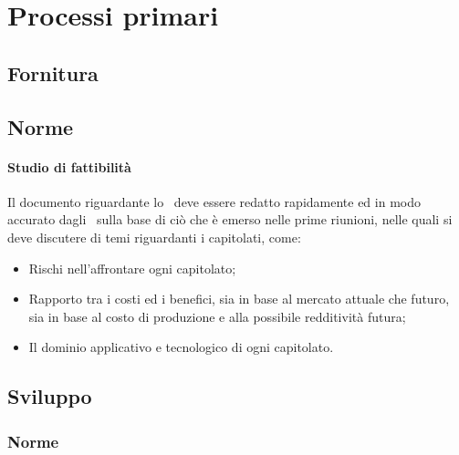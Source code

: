 \documentclass[../NormeProgetto.tex]{subfiles}
\begin{document}
\section{Processi primari}
	\subsection{Fornitura}
		\subsection{Norme}
			\paragraph{Studio di fattibilità}
			Il documento riguardante lo \studiodifattibilita\ deve essere redatto rapidamente ed in modo accurato dagli \analisti\ sulla base di ciò che è emerso nelle prime riunioni, nelle quali si deve discutere di temi riguardanti i capitolati, come:
			\begin{itemize}
				\item Rischi nell'affrontare ogni capitolato\g;
				\item Rapporto tra i costi ed i benefici, sia in base al mercato attuale che futuro, sia in base al costo di produzione e alla possibile redditività futura;
				\item Il dominio applicativo e tecnologico di ogni capitolato\g.
			\end{itemize}
	\subsection{Sviluppo}
		\subsubsection{Norme}
\end{document}
